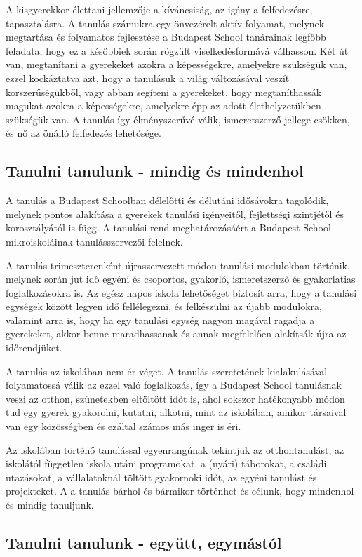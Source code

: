 A kisgyerekkor élettani jellemzője a kíváncsiság, az igény a felfedezésre,
tapasztalásra. A tanulás számukra egy önvezérelt aktív folyamat, melynek
megtartása és folyamatos fejlesztése a Budapest School tanárainak legfőbb
feladata, hogy ez a későbbiek során rögzült viselkedésformává válhasson. Két út
van, megtanítani a gyerekeket azokra a képességekre, amelyekre szükségük van,
ezzel kockáztatva azt, hogy a tanulásuk a világ változásával veszít
korszerűségükből, vagy abban segíteni a gyerekeket, hogy megtaníthassák magukat
azokra a képességekre, amelyekre épp az adott élethelyzetükben szükségük van. A
tanulás így élményszerűvé válik, ismeretszerző jellege csökken, és nő az önálló
felfedezés lehetősége.

\subsection{Tanulni tanulunk - mindig és mindenhol}
A tanulás a Budapest Schoolban délelőtti és délutáni idősávokra tagolódik,
melynek pontos alakítása a gyerekek tanulási igényeitől, fejlettségi szintjétől
és korosztályától is függ. A tanulási rend meghatározásáért a Budapest School
mikroiskoláinak tanulásszervezői felelnek.

A tanulás trimeszterenként újraszervezett módon tanulási modulokban történik,
melynek során jut idő egyéni és csoportos, gyakorló, ismeretszerző és
gyakorlatias foglalkozásokra is. Az egész napos iskola lehetőséget biztosít
arra, hogy a tanulási egységek között legyen idő fellélegezni, és felkészülni
az újabb modulokra, valamint arra is, hogy ha egy tanulási egység nagyon
magával ragadja a gyerekeket, akkor benne maradhassanak és annak megfelelően
alakítsák újra az időrendjüket.

A tanulás az iskolában nem ér véget. A tanulás
szeretetének kialakulásával folyamatossá válik az ezzel való foglalkozás, így a
Budapest School tanulásnak veszi az otthon, szünetekben eltöltött időt is, ahol
sokszor hatékonyabb módon tud egy gyerek gyakorolni, kutatni, alkotni, mint az
iskolában, amikor
társaival van egy közösségben és ezáltal számos más inger is éri.

Az iskolában történő tanulással egyenrangúnak tekintjük az otthontanulást, az
iskolától független iskola utáni programokat, a (nyári) táborokat, a családi utazásokat, a
vállalatoknál töltött gyakornoki időt, az egyéni tanulást és projekteket. A
a tanulás bárhol és bármikor történhet és célunk, hogy mindenhol és mindig tanuljunk.

\subsection{Tanulni tanulunk - együtt, egymástól}

